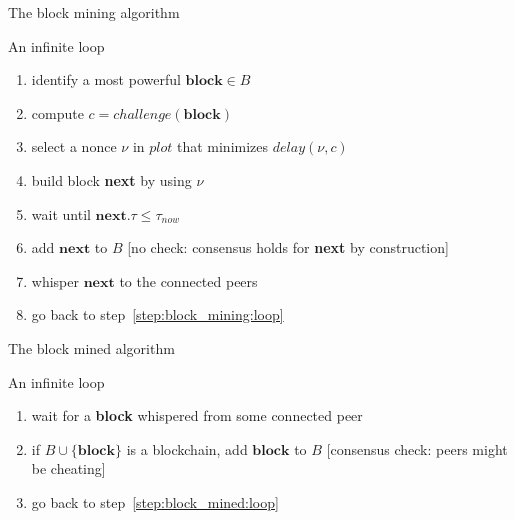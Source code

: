 \documentclass[11pt]{beamer}  %
\newcommand{\plot}{{\mathit{plot}}}
\newcommand{\challenge}{{\mathit{challenge}}}
\newcommand{\delay}{{\mathit{delay}}}
\newcommand{\now}{{\mathit{now}}}
\begin{document}
\begin{frame}{The block mining algorithm}

  \begin{greenbox}{An infinite loop}
    \begin{enumerate}[<+->]
    \item\label{step:block_mining:loop} identify a most powerful $\mathbf{block}\in B$
    \item\label{step:block_mining:next_challenge} compute $c=\challenge(\mathbf{block})$
    \item\label{step:block_mining:next_deadline} select a nonce $\nu$ in $\plot$ that minimizes $\delay(\nu,c)$
    \item\label{step:block_mining:next_block} build block \textbf{next} by using $\nu$
    \item\label{step:block_mining:wait} wait until $\mathbf{next}.\tau\le\tau_\now$
    \item\label{step:block_mining:add} add $\mathbf{next}$ to $B$ [no check: consensus holds for \textbf{next} by construction]
    \item\label{step:block_mining:whisper} whisper $\mathbf{next}$ to the connected peers
    \item go back to step~\ref{step:block_mining:loop}
    \end{enumerate}
  \end{greenbox}

\end{frame}

\begin{frame}{The block mined algorithm}

  \begin{greenbox}{An infinite loop}
    \begin{enumerate}[<+->]
    \item\label{step:block_mined:loop} wait for a \textbf{block} whispered from some connected peer
    \item\label{step:block_mined:add} if $B\cup\{\mathbf{block}\}$ is a blockchain, add $\mathbf{block}$ to $B$ [consensus check: peers might be cheating]
    \item go back to step~\ref{step:block_mined:loop}
    \end{enumerate}
  \end{greenbox}

\end{frame}
\end{document}

